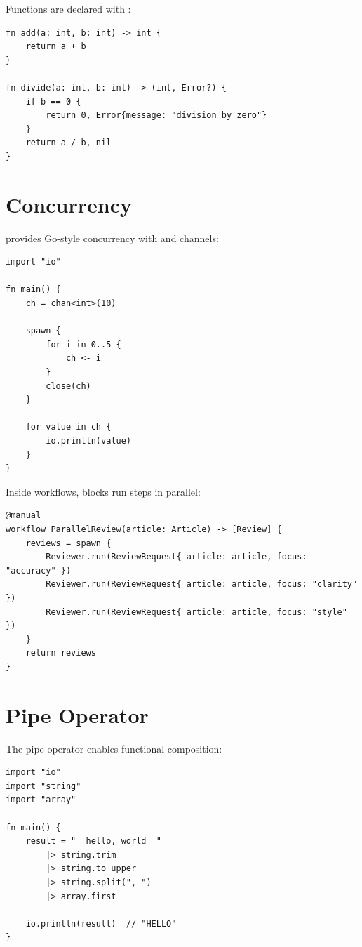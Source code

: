 Functions are declared with :

\begin{lstlisting}
fn add(a: int, b: int) -> int {
    return a + b
}

fn divide(a: int, b: int) -> (int, Error?) {
    if b == 0 {
        return 0, Error{message: "division by zero"}
    }
    return a / b, nil
}
\end{lstlisting}

\section{Concurrency}

\haira{} provides Go-style concurrency with  and channels:

\begin{lstlisting}
import "io"

fn main() {
    ch = chan<int>(10)

    spawn {
        for i in 0..5 {
            ch <- i
        }
        close(ch)
    }

    for value in ch {
        io.println(value)
    }
}
\end{lstlisting}

Inside workflows,  blocks run steps in parallel:

\begin{lstlisting}
@manual
workflow ParallelReview(article: Article) -> [Review] {
    reviews = spawn {
        Reviewer.run(ReviewRequest{ article: article, focus: "accuracy" })
        Reviewer.run(ReviewRequest{ article: article, focus: "clarity" })
        Reviewer.run(ReviewRequest{ article: article, focus: "style" })
    }
    return reviews
}
\end{lstlisting}

\section{Pipe Operator}

The pipe operator \code{|>} enables functional composition:

\begin{lstlisting}
import "io"
import "string"
import "array"

fn main() {
    result = "  hello, world  "
        |> string.trim
        |> string.to_upper
        |> string.split(", ")
        |> array.first

    io.println(result)  // "HELLO"
}
\end{lstlisting}

